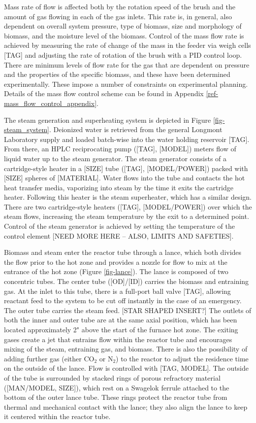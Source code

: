 \documentclass[11pt,twocolumn]{article}
\begin{document}
Mass rate of flow is affected both by the rotation speed of the brush and the amount of gas flowing in each of the gas inlets.  This rate is, in general, also dependent on overall system pressure, type of biomass, size and morphology of biomass, and the moisture level of the biomass.  Control of the mass flow rate is achieved by measuring the rate of change of the mass in the feeder via weigh cells [TAG] and adjusting the rate of rotation of the brush with a PID control loop.  There are minimum levels of flow rate for the gas that are dependent on pressure and the properties of the specific biomass, and these have been determined experimentally.  These impose a number of constraints on experimental planning.  Details of the mass flow control scheme can be found in Appendix \ref{ref-mass_flow_control_appendix}.  

The steam generation and superheating system is depicted in Figure \ref{fig-steam_system}.  Deionized water is retrieved from the general Longmont Laboratory supply and loaded batch-wise into the water holding reservoir [TAG].  From there, an HPLC reciprocating pump ([TAG], [MODEL]) meters flow of liquid water up to the steam generator.  The steam generator consists of a cartridge-style heater in a [SIZE] tube ([TAG], [MODEL/POWER]) packed with [SIZE] spheres of [MATERIAL].  Water flows into the tube and contacts the hot heat transfer media, vaporizing into steam by the time it exits the cartridge heater.  Following this heater is the steam superheater, which has a similar design.  There are two cartridge-style heaters ([TAG], [MODEL/POWER]) over which the steam flows, increasing the steam temperature by the exit to a determined point.  Control of the steam generator is achieved by setting the temperature of the control element [NEED MORE HERE -- ALSO, LIMITS AND SAFETIES].

Biomass and steam enter the reactor tube through a lance, which both divides the flow prior to the hot zone and provides a nozzle for flow to mix at the entrance of the hot zone (Figure \ref{fig-lance}).  The lance is composed of two concentric tubes.  The center tube ([OD]/[ID]) carries the biomass and entraining gas.  At the inlet to this tube, there is a full-port ball valve [TAG], allowing reactant feed to the system to be cut off instantly in the case of an emergency.  The outer tube carries the steam feed.  [STAR SHAPED INSERT?]  The outlets of both the inner and outer tube are at the same axial position, which has been located approximately 2" above the start of the furnace hot zone.  The exiting gases create a jet that entrains flow within the reactor tube and encourages mixing of the steam, entraining gas, and biomass.  There is also the possibility of adding further gas (either CO$_2$ or N$_2$) to the reactor to adjust the residence time on the outside of the lance.  Flow is controlled with [TAG, MODEL].  The outside of the tube is surrounded by stacked rings of porous refractory material ([MAN/MODEL, SIZE]), which rest on a Swagelok ferrule attached to the bottom of the outer lance tube.  These rings protect the reactor tube from thermal and mechanical contact with the lance; they also align the lance to keep it centered within the reactor tube.
\end{document}

